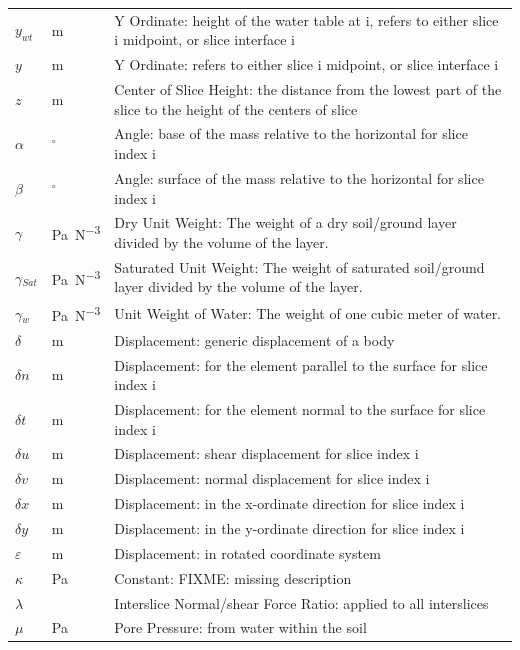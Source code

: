 \documentclass[12pt]{article}
\begin{document}
\begin{longtable}{  l  l  p{8.5cm}  }
${y_{wt}}$ &  \si{\meter}&Y Ordinate: height of the water table at i, refers to either slice i midpoint, or slice interface i 
\\
$y$ &  \si{\meter}&Y Ordinate: refers to either slice i midpoint, or slice interface i 
\\
$z$ & \si{\meter}& Center of Slice Height: the distance from the lowest part of the slice to the height of the centers of slice
\\
$\alpha{}$ & ${}^{\circ}$ &Angle: base of the mass relative to the horizontal for slice index i
\\
$\beta{}$ &${}^{\circ}$ & Angle: surface of the mass relative to the horizontal for slice index i
\\
$\gamma{}$ & \si{\pascal\per\cubic\newton} &Dry Unit Weight: The weight of a dry soil/ground layer divided by the volume of the layer.
\\
${\gamma{}_{Sat}}$ &  \si{\pascal\per\cubic\newton} &Saturated Unit Weight: The weight of saturated soil/ground layer divided by the volume of the layer.
\\
${\gamma{}_{w}}$ & \si{\pascal\per\cubic\newton} & Unit Weight of Water: The weight of one cubic meter of water.
\\
$\delta{}$ & \si{\meter}& Displacement: generic displacement of a body 
\\
$\delta{}n$ & \si{\meter}& Displacement: for the element parallel to the surface for slice index i
\\
$\delta{}t$ &  \si{\meter}&Displacement: for the element normal to the surface for slice index i 
\\
$\delta{}u$ &  \si{\meter}&Displacement: shear displacement for slice index i 
\\
$\delta{}v$ & \si{\meter}& Displacement: normal displacement for slice index i 
\\
$\delta{}x$ &  \si{\meter}& Displacement: in the x-ordinate direction for slice index i 
\\
$\delta{}y$ &  \si{\meter}& Displacement: in the y-ordinate direction for slice index i 
\\
$\varepsilon{}$ & \si{\meter}& Displacement: in rotated coordinate system
\\
$\kappa{}$ &\si{\pascal} & Constant: FIXME: missing description
\\
$\lambda{}$ & & Interslice Normal/shear Force Ratio: applied to all interslices
\\
$\mu{}$ &\si{\pascal} & Pore Pressure: from water within the soil

\end{longtable}
\end{document}
